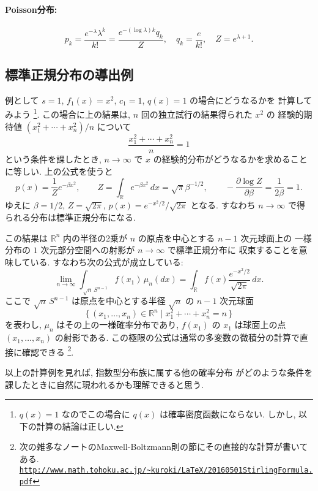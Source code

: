 \documentclass[12pt,twoside]{jarticle}
\newcommand\R{{\mathbb R}} %
\renewcommand\d{\partial}
\theoremstyle{jplain}
\theoremstyle{jplain}
\theoremstyle{jplain}
\numberwithin{theorem}{section}
\numberwithin{equation}{section}
\numberwithin{figure}{section}
\numberwithin{table}{section}
\begin{document}
\paragraph{Poisson分布:}
\[
p_k 
= \frac{e^{-\lambda}\lambda^k}{k!}
=\frac{e^{-(\log\lambda)k}q_k}{Z},
\quad  
q_k=\frac{e}{k!},
\quad
Z=e^{\lambda+1}.
\]


\subsection{標準正規分布の導出例}
\label{sec:normal-Gibbs}

例として $s=1$, $f_1(x)=x^2$, $c_1=1$, $q(x)=1$ の場合にどうなるかを
計算してみよう%
\footnote{$q(x)=1$ なのでこの場合に $q(x)$ は確率密度函数にならない.
しかし, 以下の計算の結論は正しい.}.
この場合に上の結果は, $n$ 回の独立試行の結果得られた $x^2$ の
経験的期待値 $(x_1^2+\cdots+x_n^2)/n$ について
\[
\frac{x_1^2+\cdots+x_n^2}{n}=1
\]
という条件を課したとき, 
$n\to\infty$ で $x$ の経験的分布がどうなるかを求めることに等しい.
上の公式を使うと
\[
p(x)=\frac{1}{Z}e^{-\beta x^2}, \qquad
Z=\int_\R e^{-\beta x^2}\,dx=\sqrt{\pi}\beta^{-1/2}, \qquad
-\frac{\d\log Z}{\d\beta}=\frac{1}{2\beta}=1.
\]
ゆえに $\beta=1/2$, $Z=\sqrt{2\pi}$, $p(x)=e^{-x^2/2}/\sqrt{2\pi}$ となる.
すなわち $n\to\infty$ で得られる分布は標準正規分布になる.

この結果は $\R^n$ 内の半径の2乗が $n$ の原点を中心とする $n-1$ 次元球面上の
一様分布の $1$ 次元部分空間への射影が $n\to\infty$ で標準正規分布に
収束することを意味している. すなわち次の公式が成立している:
\[
\lim_{n\to\infty}\int_{\sqrt{n}\,S^{n-1}} f(x_1)\,\mu_n(dx)
=\int_\R f(x)\frac{e^{-x^2/2}}{\sqrt{2\pi}}\,dx.
\]
ここで $\sqrt{n}\,S^{n-1}$ は原点を中心とする半径 $\sqrt{n}$ の $n-1$ 次元球面
\[
\{\,(x_1,\ldots,x_n)\in\R^n\mid x_1^2+\cdots+x_n^2=n\,\}
\]
を表わし, $\mu_n$ はその上の一様確率分布であり, 
$f(x_1)$ の $x_1$ は球面上の点 $(x_1,\ldots,x_n)$ の射影である.
この極限の公式は通常の多変数の微積分の計算で直接に確認できる%
\footnote{次の雑多なノートのMaxwell-Boltzmann則の節にその直接的な計算が書いてある. \\
\href{http://www.math.tohoku.ac.jp/~kuroki/LaTeX/20160501StirlingFormula.pdf}
{\tt http://www.math.tohoku.ac.jp/{\textasciitilde}kuroki/LaTeX/20160501StirlingFormula.pdf}}.

以上の計算例を見れば, 指数型分布族に属する他の確率分布
がどのような条件を課したときに自然に現われるかも理解できると思う.

\end{document}
